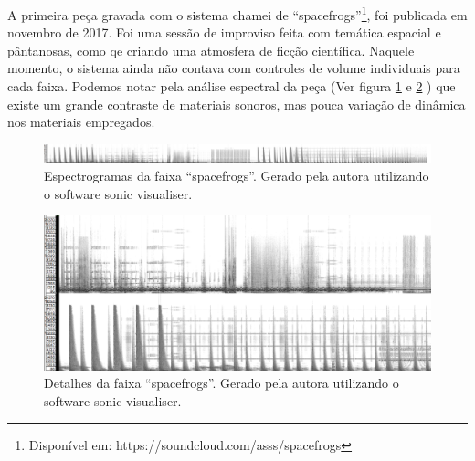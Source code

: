 A primeira peça gravada com o sistema chamei de ``spacefrogs''\footnote{Disponível em: https://soundcloud.com/asss/spacefrogs}, foi publicada em novembro de 2017. Foi uma sessão de improviso feita com temática espacial e pântanosas, como qe criando uma atmosfera de ficção científica. Naquele momento, o sistema ainda não contava com controles de volume individuais para cada faixa. Podemos notar pela análise espectral da peça (Ver figura \ref{fig:spacefrogs} e \ref{fig:spacefrogsdt} ) que existe um grande contraste de materiais sonoros, mas pouca variação de dinâmica nos materiais empregados.

\begin{figure}

\includegraphics[width=1\textwidth]{pictures/cap4/spacefrogs_spectrogram}
\caption{Espectrogramas da faixa ``spacefrogs''. Gerado pela autora utilizando o software sonic visualiser.}
\label{fig:spacefrogs}
\end{figure}

\begin{figure}

\includegraphics[width=1\textwidth]{pictures/cap4/spacefrogs_spectrogram_dt}
\caption{Detalhes da faixa ``spacefrogs''. Gerado pela autora utilizando o software sonic visualiser.}
\label{fig:spacefrogsdt}
\end{figure}






